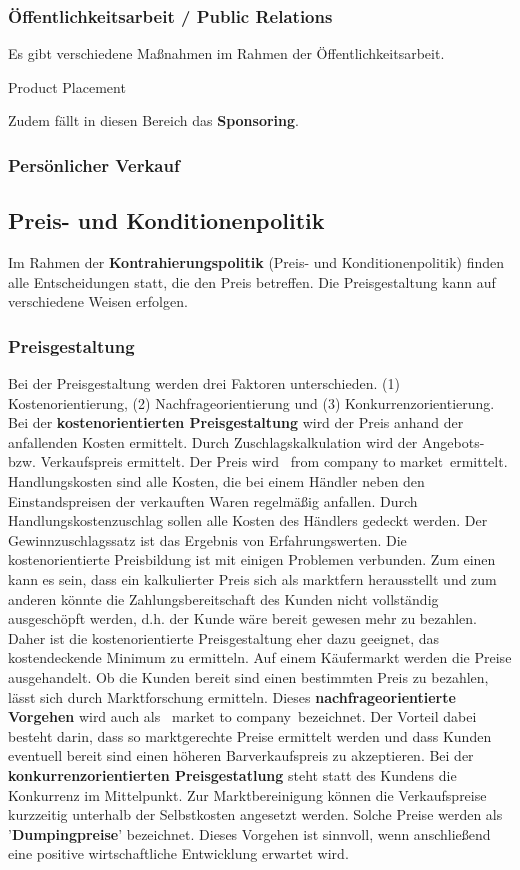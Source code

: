 \subsubsection{Öffentlichkeitsarbeit / Public Relations}

Es gibt verschiedene Maßnahmen im Rahmen der Öffentlichkeitsarbeit.

Product Placement

Zudem fällt in diesen Bereich das {\bf Sponsoring}.

\subsubsection{Persönlicher Verkauf}


\subsection{Preis- und Konditionenpolitik}

Im Rahmen der {\bf Kontrahierungspolitik} (Preis- und Konditionenpolitik) finden alle Entscheidungen statt, die den Preis betreffen. Die Preisgestaltung kann auf verschiedene Weisen erfolgen.

\subsubsection{Preisgestaltung}

Bei der Preisgestaltung werden drei Faktoren unterschieden. (1) Kostenorientierung, (2) Nachfrageorientierung und (3) Konkurrenzorientierung. Bei der {\bf kostenorientierten Preisgestaltung} wird der Preis anhand der anfallenden Kosten ermittelt. Durch Zuschlagskalkulation wird der Angebots- bzw. Verkaufspreis ermittelt. Der Preis wird \qr\ from company to market\qr\ ermittelt. Handlungskosten sind alle Kosten, die bei einem Händler neben den Einstandspreisen der verkauften Waren regelmäßig anfallen. Durch Handlungskostenzuschlag sollen alle Kosten des Händlers gedeckt werden. Der Gewinnzuschlagssatz ist das Ergebnis von Erfahrungswerten. Die kostenorientierte Preisbildung ist mit einigen Problemen verbunden. Zum einen kann es sein, dass ein kalkulierter Preis sich als marktfern herausstellt und zum anderen könnte die Zahlungsbereitschaft des Kunden nicht vollständig ausgeschöpft werden, d.h. der Kunde wäre bereit gewesen mehr zu bezahlen. Daher ist die kostenorientierte Preisgestaltung eher dazu geeignet, das kostendeckende Minimum zu ermitteln. Auf einem Käufermarkt werden die Preise ausgehandelt. Ob die Kunden bereit sind einen bestimmten Preis zu bezahlen, lässt sich durch Marktforschung ermitteln. Dieses {\bf nachfrageorientierte Vorgehen} wird auch als \qr\ market to company\qr\ bezeichnet. Der Vorteil dabei besteht darin, dass so marktgerechte Preise ermittelt werden und dass Kunden eventuell bereit sind einen höheren Barverkaufspreis zu akzeptieren. Bei der {\bf konkurrenzorientierten Preisgestatlung} steht statt des Kundens die Konkurrenz im Mittelpunkt. Zur Marktbereinigung können die Verkaufspreise kurzzeitig unterhalb der Selbstkosten angesetzt werden. Solche Preise werden als '{\bf Dumpingpreise}' bezeichnet. Dieses Vorgehen ist sinnvoll, wenn anschließend eine positive wirtschaftliche Entwicklung erwartet wird.

